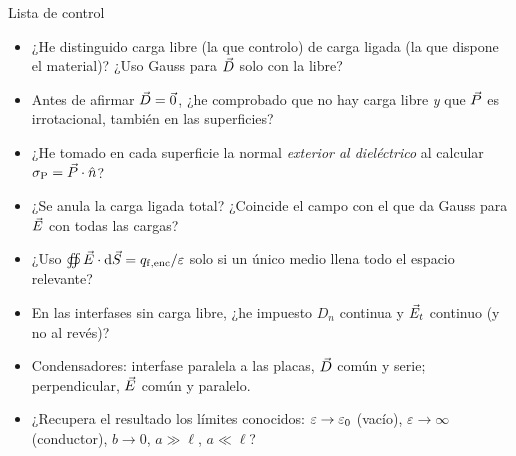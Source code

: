 \begin{metodo}{Lista de control}
\begin{itemize}
  \item ¿He distinguido carga libre (la que controlo) de carga ligada (la que dispone el material)? ¿Uso Gauss para $\vec D$ solo con la libre?
  \item Antes de afirmar $\vec D=\vec 0$, ¿he comprobado que no hay carga libre \emph{y} que $\vec P$ es irrotacional, también en las superficies?
  \item ¿He tomado en cada superficie la normal \emph{exterior al dieléctrico} al calcular $\sigma_{\mathrm P}=\vec P\cdot\hat n$?
  \item ¿Se anula la carga ligada total? ¿Coincide el campo con el que da Gauss para $\vec E$ con todas las cargas?
  \item ¿Uso $\oiint\vec E\cdot\mathop{}\!\mathrm{d}\vec S=q_{\mathrm{f,enc}}/\varepsilon$ solo si un único medio \LHI{} llena todo el espacio relevante?
  \item En las interfases sin carga libre, ¿he impuesto $D_n$ continua y $\vec E_t$ continuo (y no al revés)?
  \item Condensadores: interfase paralela a las placas, $\vec D$ común y serie; perpendicular, $\vec E$ común y paralelo.
  \item ¿Recupera el resultado los límites conocidos: $\varepsilon\to\varepsilon_0$ (vacío), $\varepsilon\to\infty$ (conductor), $b\to0$, $a\gg\ell$, $a\ll\ell$?
\end{itemize}
\end{metodo}
